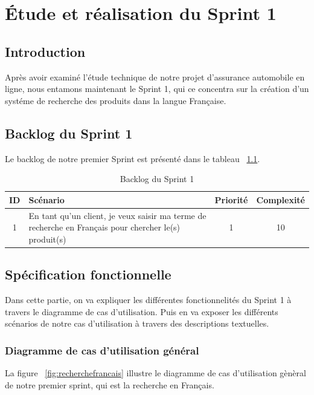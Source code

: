 \chapter{Étude et réalisation du Sprint 1}
\localtableofcontents
\section{Introduction}
\noindent
Après avoir examiné l'étude technique de notre projet d'assurance automobile en ligne, nous entamons maintenant le Sprint 1, qui ce concentra sur la création d'un systéme de recherche des produits dans la langue Française.

\section{Backlog du Sprint 1}
\noindent
Le backlog de notre premier Sprint est présenté dans le tableau ~\ref{tab:sprint1}.

\begin{table}[H]
	\centering

	\begin{tabularx}{\textwidth}{|c|X|c|c|}
		\hline
		\rowcolor{blue!20}
		\textbf{ID} & \textbf{Scénario}                                                                                     & \textbf{Priorité} & \textbf{Complexité} \\ \hline
		1           & En tant qu'un client, je veux saisir ma terme de recherche en Français pour chercher le(s) produit(s) & 1                 & 10                  \\ \hline
	\end{tabularx}
	\caption{Backlog du Sprint 1}
	\label{tab:sprint1}
\end{table}

\section{Spécification fonctionnelle}
\noindent
Dans cette partie, on va expliquer les différentes fonctionnelités du Sprint 1 à travers le diagramme de cas d'utilisation. Puis en va exposer les différents scénarios de notre cas d'utilisation à travers des descriptions textuelles.

\subsection{Diagramme de cas d'utilisation général}
\noindent
La figure ~\ref{fig:recherchefrancais} illustre le diagramme de cas d'utilisation gènèral de notre premier sprint, qui est la recherche en Français.

